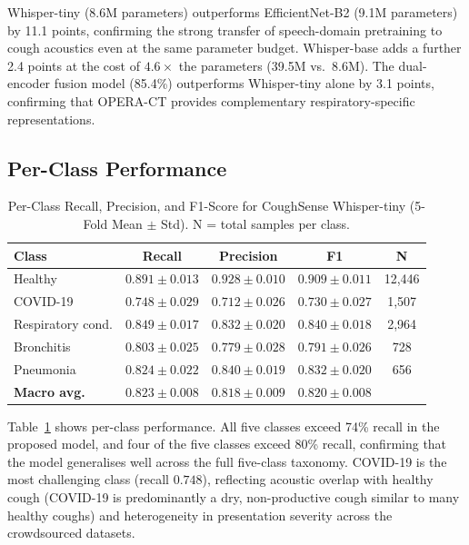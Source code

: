 \documentclass[10pt,journal,compsoc]{IEEEtran}
\begin{document}
Whisper-tiny (8.6M parameters) outperforms EfficientNet-B2 (9.1M parameters)
by 11.1 points, confirming the strong transfer of speech-domain pretraining
to cough acoustics even at the same parameter budget.
Whisper-base adds a further 2.4 points at the cost of $4.6\times$ the
parameters (39.5M vs.\ 8.6M). The dual-encoder fusion model (85.4\%)
outperforms Whisper-tiny alone by 3.1 points, confirming that OPERA-CT
provides complementary respiratory-specific representations.

\subsection{Per-Class Performance}

\begin{table}[!t]
\caption{Per-Class Recall, Precision, and F1-Score for CoughSense Whisper-tiny
         (5-Fold Mean $\pm$ Std). N = total samples per class.}
\label{tab:perclass}
\centering
\setlength{\tabcolsep}{4pt}
\begin{tabular}{lcccc}
\toprule
\textbf{Class} & \textbf{Recall} & \textbf{Precision} & \textbf{F1} & \textbf{N} \\
\midrule
Healthy           & $0.891\pm0.013$ & $0.928\pm0.010$ & $0.909\pm0.011$ & 12{,}446 \\
COVID-19          & $0.748\pm0.029$ & $0.712\pm0.026$ & $0.730\pm0.027$ &  1{,}507 \\
Respiratory cond. & $0.849\pm0.017$ & $0.832\pm0.020$ & $0.840\pm0.018$ &  2{,}964 \\
Bronchitis        & $0.803\pm0.025$ & $0.779\pm0.028$ & $0.791\pm0.026$ &    728   \\
Pneumonia         & $0.824\pm0.022$ & $0.840\pm0.019$ & $0.832\pm0.020$ &    656   \\
\midrule
\textbf{Macro avg.} & $\mathbf{0.823}\pm0.008$ & $\mathbf{0.818}\pm0.009$
                    & $\mathbf{0.820}\pm0.008$ & \\
\bottomrule
\end{tabular}
\end{table}

Table~\ref{tab:perclass} shows per-class performance.
All five classes exceed 74\% recall in the proposed model, and four
of the five classes exceed 80\% recall, confirming that the model
generalises well across the full five-class taxonomy.
COVID-19 is the most challenging class (recall $0.748$), reflecting
acoustic overlap with healthy cough (COVID-19 is predominantly a dry,
non-productive cough similar to many healthy coughs) and heterogeneity
in presentation severity across the crowdsourced datasets.
\end{document}
